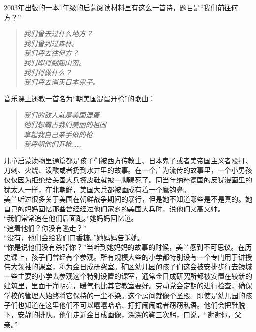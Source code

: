 2003年出版的一本1年级的启蒙阅读材料里有这么一首诗，题目是“我们前往何方？”\\

\begin{quote}
	\begin{spacing}{1.0}  %
		\textit{{\footnotesize 	我们曾去过什么地方？\\
		我们曾到过森林。\\
		我们将去往何方？\\
		我们即将翻越山峦。\\
		我们将做什么？\\
		我们将去消灭日本鬼子。\\}}
	\end{spacing}
\end{quote}

音乐课上还教一首名为“朝美国混蛋开枪”的歌曲：\\

\begin{quote}
	\begin{spacing}{1.0}  %
		\textit{{\footnotesize 	我们的敌人就是美国混蛋\\
		他们想霸占我们美丽的祖国\\
		拿起我自己亲手做的枪\\
		我将朝他们开枪……\\}}
	\end{spacing}
\end{quote}

儿童启蒙读物里通篇都是孩子们被西方传教士、日本鬼子或者美帝国主义者殴打、刀刺、火烧、泼酸或者扔到水井里的故事。在一个广为流传的故事里，一个小男孩仅仅因为拒绝给美国大兵擦皮鞋就被一脚踢死了。同当年纳粹德国的反犹漫画里的犹太人一样，在北朝鲜，美国大兵都被画成有着一个鹰钩鼻。\\

美兰听过很多关于美国在朝鲜战争期间的暴行，但是她不知道哪些是不是真的。她自己的妈妈回忆那些曾经经过他们家乡的美国大兵时，说他们又高又帅。\\

“我们常常追在他们后面跑。”她妈妈回忆道。\\

“追着他们？你没有逃走？”\\

“没有，他们会给我们口香糖。”她妈妈告诉她。\\

“你是说他们没有杀掉你？”当听到她妈妈的故事的时候，美兰感到不可思议。在历史课上，孩子们曾经有个参观。所有规模大些的小学都特别设有一个专门用于讲授伟大领袖的课室，称为金日成研究室。矿区幼儿园的孩子们这会被安排步行去镜城一些主要的小学去参观这个特别设置的课室，通常金日成研究所都被安置在较新的建筑里，里面干净明亮，暖气也比其它教室要好。劳动党会定期的进行检查，确保学校的管理人始终将它保持的一尘不染。这个房间就像个圣殿。即使是幼儿园的孩子们也知道在这里他们不可以嘻嘻哈哈、打打闹闹或者窃窃私语。他们会把鞋脱下，安静的排队。他们走近金日成画像，深深的鞠三次躬，口说，“谢谢你，父亲。”\\

